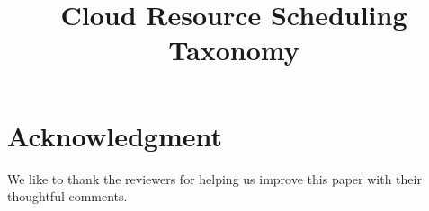 \documentclass[sigconf]{acmart}
\newcommand{\TITLE}{Cloud Resource Scheduling Taxonomy}
\begin{document}




\title{\TITLE}

\maketitle







\section*{Acknowledgment}

We like to thank the reviewers for helping us improve this paper with their thoughtful comments.
















\clearpage



\end{document}
